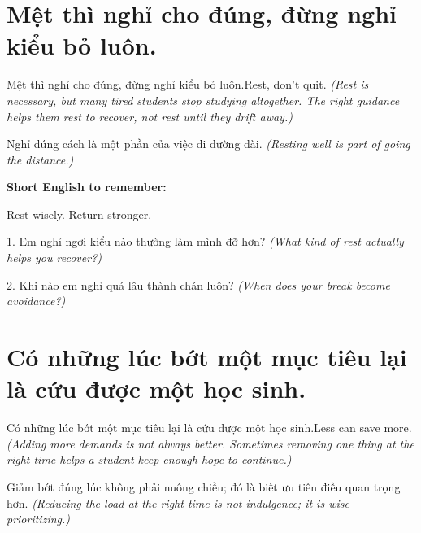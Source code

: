 \section{Mệt thì nghỉ cho đúng, đừng nghỉ kiểu bỏ luôn.}
\begin{truyen}{Mệt thì nghỉ cho đúng, đừng nghỉ kiểu bỏ luôn.}{Rest, don't quit.}
\textit{(Rest is necessary, but many tired students stop studying altogether. The right guidance helps them rest to recover, not rest until they drift away.)}
\end{truyen}

\begin{baihoc}
Nghỉ đúng cách là một phần của việc đi đường dài.
\textit{(Resting well is part of going the distance.)}
\end{baihoc}

\begin{ghinhoanh}
\textbf{Short English to remember:}

Rest wisely. Return stronger.

\end{ghinhoanh}

\begin{tuhocnhanh}
1. Em nghỉ ngơi kiểu nào thường làm mình đỡ hơn? \textit{(What kind of rest actually helps you recover?)}

2. Khi nào em nghỉ quá lâu thành chán luôn? \textit{(When does your break become avoidance?)}
\end{tuhocnhanh}
\ngancach


\section{Có những lúc bớt một mục tiêu lại là cứu được một học sinh.}
\begin{truyen}{Có những lúc bớt một mục tiêu lại là cứu được một học sinh.}{Less can save more.}
\textit{(Adding more demands is not always better. Sometimes removing one thing at the right time helps a student keep enough hope to continue.)}
\end{truyen}

\begin{baihoc}
Giảm bớt đúng lúc không phải nuông chiều; đó là biết ưu tiên điều quan trọng hơn.
\textit{(Reducing the load at the right time is not indulgence; it is wise prioritizing.)}
\end{baihoc}

